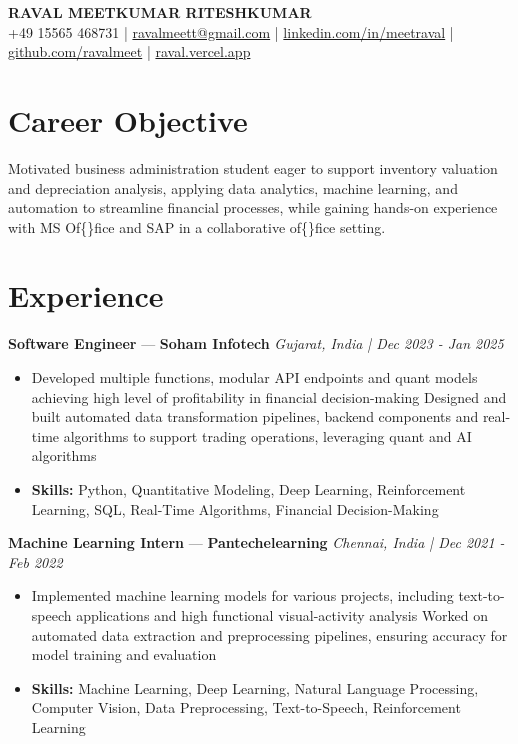 \documentclass[a4paper,10pt]{article}
\begin{document}
\begin{center}
  {\Large\bfseries RAVAL MEETKUMAR RITESHKUMAR}\\[2pt]
  {\small +49 15565 468731 \;|\; \href{mailto:ravalmeett@gmail.com}{ravalmeett@gmail.com} \;|\; \href{https://www.linkedin.com/in/meetraval/}{linkedin.com/in/meetraval} \;|\; \href{https://github.com/ravalmeet}{github.com/ravalmeet} \;|\; \href{https://raval.vercel.app/}{raval.vercel.app}}
\end{center}
\vspace{-3pt}

\section*{Career Objective}
Motivated business administration student eager to support inventory valuation and depreciation analysis, applying data analytics, machine learning, and automation to streamline financial processes, while gaining hands-on experience with MS Of\{\}fice and SAP in a collaborative of\{\}fice setting.\par

\section*{Experience}
\textbf{Software Engineer} — \textbf{Soham Infotech} \hfill \textit{Gujarat, India \;|\; Dec 2023 - Jan 2025}\par
\vspace{1pt}
\begin{itemize}
  \item Developed multiple functions, modular API endpoints and quant models achieving high level of profitability in financial decision-making Designed and built automated data transformation pipelines, backend components and real-time algorithms to support trading operations, leveraging quant and AI algorithms
  \item \textbf{Skills:} Python, Quantitative Modeling, Deep Learning, Reinforcement Learning, SQL, Real-Time Algorithms, Financial Decision-Making
\end{itemize}
\vspace{3pt}
\textbf{Machine Learning Intern} — \textbf{Pantechelearning} \hfill \textit{Chennai, India \;|\; Dec 2021 - Feb 2022}\par
\vspace{1pt}
\begin{itemize}
  \item Implemented machine learning models for various projects, including text-to-speech applications and high functional visual-activity analysis Worked on automated data extraction and preprocessing pipelines, ensuring accuracy for model training and evaluation
  \item \textbf{Skills:} Machine Learning, Deep Learning, Natural Language Processing, Computer Vision, Data Preprocessing, Text-to-Speech, Reinforcement Learning
\end{itemize}
\end{document}

